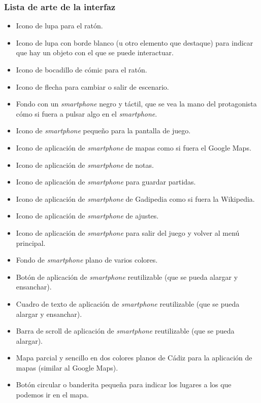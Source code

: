             \subsubsection{Lista de arte de la interfaz}
            \begin{itemize}
            \item Icono de lupa para el ratón.
            \item Icono de lupa con borde blanco (u otro elemento que destaque) para indicar que hay un objeto con el que se puede interactuar.
            \item Icono de bocadillo de cómic para el ratón.
            \item Icono de flecha para cambiar o salir de escenario. 
            \item Fondo con un \emph{smartphone} negro y táctil, que se vea la mano del protagonista cómo si fuera a pulsar algo en el \emph{smartphone}.
            \item Icono de \emph{smartphone} pequeño para la pantalla de juego.
            \item Icono de aplicación de \emph{smartphone} de mapas como si fuera el Google Maps.
            \item Icono de aplicación de \emph{smartphone} de notas.
            \item Icono de aplicación de \emph{smartphone} para guardar partidas.
            \item Icono de aplicación de \emph{smartphone} de Gadipedia como si fuera la Wikipedia.
            \item Icono de aplicación de \emph{smartphone} de ajustes.
            \item Icono de aplicación de \emph{smartphone} para salir del juego y volver al menú principal.
            \item Fondo de \emph{smartphone} plano de varios colores.
            \item Botón de aplicación de \emph{smartphone} reutilizable (que se pueda alargar y ensanchar).
            \item Cuadro de texto de aplicación de \emph{smartphone} reutilizable (que se pueda alargar y ensanchar).
            \item Barra de scroll de aplicación de \emph{smartphone} reutilizable (que se pueda alargar).
            \item Mapa parcial y sencillo en dos colores planos de Cádiz para la aplicación de mapas (similar al Google Maps).
            \item Botón circular o banderita pequeña para indicar los lugares a los que podemos ir en el mapa.
            \end{itemize}
            
